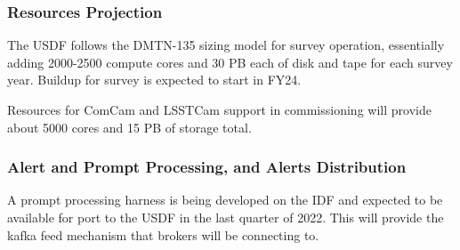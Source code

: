 \subsubsection{Resources Projection}

The USDF follows the DMTN-135 sizing model for survey operation,
essentially adding 2000-2500 compute cores and 30 PB each of disk and
tape for each survey year. Buildup for survey is expected to start in FY24.

Resources for ComCam and LSSTCam support in commissioning will provide
about 5000 cores and 15 PB of storage total.

\subsubsection{Alert and Prompt Processing, and Alerts Distribution}

A prompt processing harness is being developed on the IDF and expected to be
available for port to the USDF in the last quarter of 2022. This will
provide the kafka feed mechanism that brokers will be connecting to.